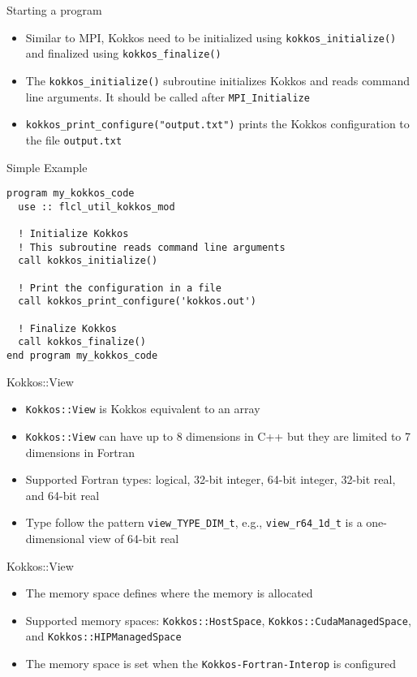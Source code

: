 \begin{frame}{Starting a program}
  \begin{itemize}
    \item Similar to MPI, Kokkos need to be initialized using
      \texttt{kokkos\_initialize()} and finalized using \texttt{kokkos\_finalize()}
    \item The \texttt{kokkos\_initialize()} subroutine initializes Kokkos and
      reads command line arguments. It should be called after
      \texttt{MPI\_Initialize}
    \item \texttt{kokkos\_print\_configure("output.txt")} prints the
      Kokkos configuration to the file \texttt{output.txt}
  \end{itemize}
\end{frame}

\begin{frame}[containsverbatim]{Simple Example}
  \begin{verbatim}
program my_kokkos_code
  use :: flcl_util_kokkos_mod

  ! Initialize Kokkos
  ! This subroutine reads command line arguments
  call kokkos_initialize()

  ! Print the configuration in a file
  call kokkos_print_configure('kokkos.out')

  ! Finalize Kokkos
  call kokkos_finalize()
end program my_kokkos_code
  \end{verbatim}
\end{frame}

\begin{frame}{Kokkos::View}
  \begin{itemize}
    \item \texttt{Kokkos::View} is Kokkos equivalent to an array
    \item \texttt{Kokkos::View} can have up to 8 dimensions in C++ but they are
      limited to 7 dimensions in Fortran
    \item Supported Fortran types: logical, 32-bit integer, 64-bit
      integer, 32-bit real, and 64-bit real
    \item Type follow the pattern \texttt{view\_TYPE\_DIM\_t}, e.g.,
      \texttt{view\_r64\_1d\_t} is a one-dimensional view of 64-bit real
  \end{itemize}
\end{frame}

\begin{frame}{Kokkos::View}
  \begin{itemize}
    \item The memory space defines where the memory is allocated
    \item Supported memory spaces: \texttt{Kokkos::HostSpace},
      \texttt{Kokkos::CudaManagedSpace}, and \texttt{Kokkos::HIPManagedSpace}
    \item The memory space is set when the \texttt{Kokkos-Fortran-Interop} is
      configured
  \end{itemize}
\end{frame}


